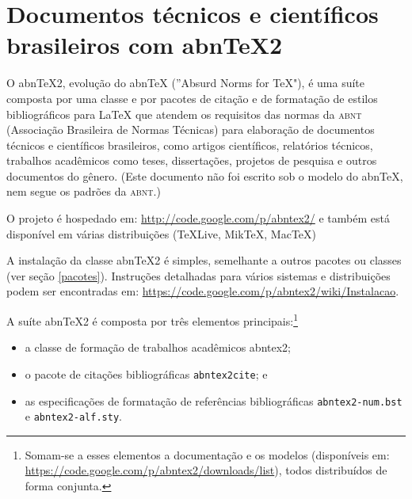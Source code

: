 \chapter{Documentos técnicos e científicos brasileiros com abnTeX2}



O abn\TeX 2, evolução do abn\TeX{} (''Absurd Norms for TeX"), é uma suíte composta por uma classe e por pacotes de citação e de formatação de estilos bibliográficos para \LaTeX{} que atendem os requisitos das normas da \textsc{abnt} (Associação Brasileira de Normas Técnicas) para elaboração de documentos técnicos e científicos brasileiros, como artigos científicos, relatórios técnicos, trabalhos acadêmicos como teses, dissertações, projetos de pesquisa e outros documentos do gênero. (Este documento não foi escrito sob o modelo do abn\TeX, nem segue os
padrões da \textsc{abnt}.)

O projeto é hospedado em: \url{http://code.google.com/p/abntex2/} e também está disponível em várias distribuições (\TeX Live, Mik\TeX, Mac\TeX{})

A instalação da classe abn\TeX 2 é simples, semelhante a outros pacotes ou classes (ver seção \ref{pacotes}). Instruções detalhadas para vários sistemas e distribuições podem ser encontradas em: \url{https://code.google.com/p/abntex2/wiki/Instalacao}.

A suíte abn\TeX 2 é composta por três elementos principais:\footnote{Somam-se a
esses elementos a documentação e os modelos (disponíveis em: \url{https://code.google.com/p/abntex2/downloads/list}), todos distribuídos de forma
conjunta.}

\begin{itemize}
  \item a classe de formação de trabalhos acadêmicos \textsf{abntex2};
  \item o pacote de citações bibliográficas \texttt{abntex2cite}; e
  \item as especificações de formatação de referências bibliográficas
  \texttt{abntex2-num.bst} e \texttt{abntex2-alf.sty}.
\end{itemize}


